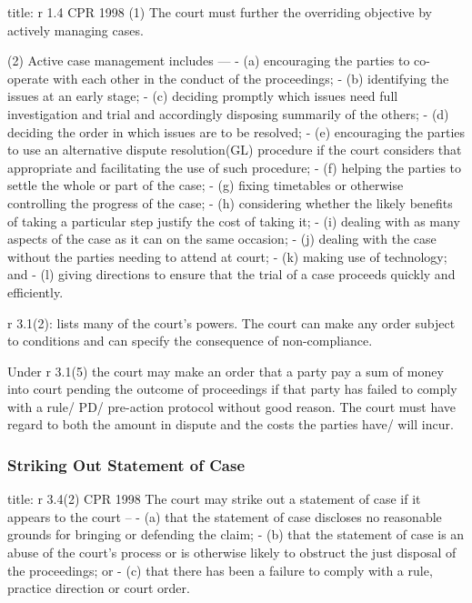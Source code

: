 \documentclass[
]{article}
\newenvironment{Shaded}{}{}
\newcommand{\NormalTok}[1]{#1}
\begin{document}
\begin{Shaded}
\begin{Highlighting}[]
\NormalTok{title: r 1.4 CPR 1998}
\NormalTok{(1) The court must further the overriding objective by actively managing cases.}

\NormalTok{(2) Active case management includes —}
\NormalTok{{-} (a) encouraging the parties to co{-}operate with each other in the conduct of the proceedings;}
\NormalTok{{-} (b) identifying the issues at an early stage;}
\NormalTok{{-} (c) deciding promptly which issues need full investigation and trial and accordingly disposing summarily of the others;}
\NormalTok{{-} (d) deciding the order in which issues are to be resolved;}
\NormalTok{{-} (e) encouraging the parties to use an alternative dispute resolution(GL) procedure if the court considers that appropriate and facilitating the use of such procedure;}
\NormalTok{{-} (f) helping the parties to settle the whole or part of the case;}
\NormalTok{{-} (g) fixing timetables or otherwise controlling the progress of the case;}
\NormalTok{{-} (h) considering whether the likely benefits of taking a particular step justify the cost of taking it;}
\NormalTok{{-} (i) dealing with as many aspects of the case as it can on the same occasion;}
\NormalTok{{-} (j) dealing with the case without the parties needing to attend at court;}
\NormalTok{{-} (k) making use of technology; and}
\NormalTok{{-} (l) giving directions to ensure that the trial of a case proceeds quickly and efficiently.}
\end{Highlighting}
\end{Shaded}

r 3.1(2): lists many of the court's powers. The court can make any order
subject to conditions and can specify the consequence of non-compliance.

Under r 3.1(5) the court may make an order that a party pay a sum of
money into court pending the outcome of proceedings if that party has
failed to comply with a rule/ PD/ pre-action protocol without good
reason. The court must have regard to both the amount in dispute and the
costs the parties have/ will incur.

\hypertarget{striking-out-statement-of-case}{%
\subsubsection{Striking Out Statement of
Case}\label{striking-out-statement-of-case}}

\begin{Shaded}
\begin{Highlighting}[]
\NormalTok{title: r 3.4(2) CPR 1998}
\NormalTok{The court may strike out a statement of case if it appears to the court –}
\NormalTok{{-} (a) that the statement of case discloses no reasonable grounds for bringing or defending the claim;}
\NormalTok{{-} (b) that the statement of case is an abuse of the court’s process or is otherwise likely to obstruct the just disposal of the proceedings; or}
\NormalTok{{-} (c) that there has been a failure to comply with a rule, practice direction or court order.}
\end{Highlighting}
\end{Shaded}
\end{document}
